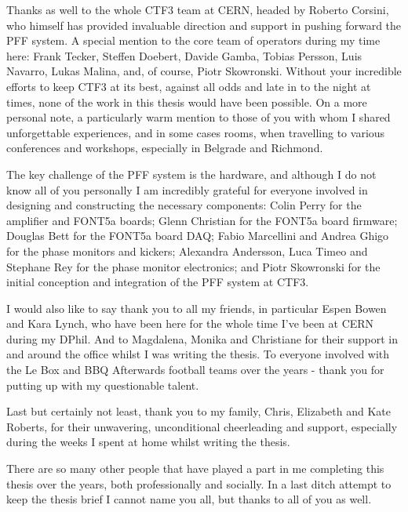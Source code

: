 Thanks as well to the whole CTF3 team at CERN, headed by Roberto Corsini, who himself has provided invaluable direction and support in pushing forward the PFF system. A special mention to the core team of operators during my time here: Frank Tecker, Steffen Doebert, Davide Gamba, Tobias Persson, Luis Navarro, Lukas Malina, and, of course, Piotr Skowronski. Without your incredible efforts to keep CTF3 at its best, against all odds and late in to the night at times, none of the work in this thesis would have been possible. On a more personal note, a particularly warm mention to those of you with whom I shared unforgettable experiences, and in some cases rooms, when travelling to various conferences and workshops, especially in Belgrade and Richmond. %

The key challenge of the PFF system is the hardware, and although I do not know all of you personally I am incredibly grateful for everyone involved in designing and constructing the necessary components: Colin Perry for the amplifier and FONT5a boards; Glenn Christian for the FONT5a board firmware; Douglas Bett for the FONT5a board DAQ; Fabio Marcellini and Andrea Ghigo for the phase monitors and kickers; Alexandra Andersson, Luca Timeo and Stephane Rey for the phase monitor electronics; and Piotr Skowronski for the initial conception and integration of the PFF system at CTF3. 

I would also like to say thank you to all my friends, in particular Espen Bowen and Kara Lynch, who have been here for the whole time I've been at CERN during my DPhil. And to Magdalena, Monika and Christiane for their support in and around the office whilst I was writing the thesis. To everyone involved with the Le Box and BBQ Afterwards football teams over the years - thank you for putting up with my questionable talent.

Last but certainly not least, thank you to my family, Chris, Elizabeth and Kate Roberts, for their unwavering, unconditional cheerleading and support, especially during the weeks I spent at home whilst writing the thesis.

There are so many other people that have played a part in me completing this thesis over the years, both professionally and socially. In a last ditch attempt to keep the thesis brief I cannot name you all, but thanks to all of you as well.

\cleardoublepage

\tableofcontents

